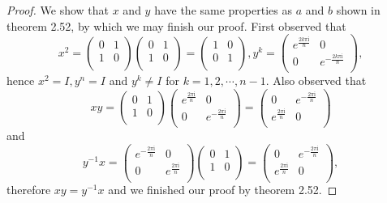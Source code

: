 \begin{proof}
We show that $x$ and $y$ have the same properties as $a$ and $b$ shown in theorem 2.52, by which we may finish our proof. First observed that 
$$
x^2=\left( \begin{matrix}
	0&		1\\
	1&		0\\
\end{matrix} \right) \left( \begin{matrix}
	0&		1\\
	1&		0\\
\end{matrix} \right) =\left( \begin{matrix}
	1&		0\\
	0&		1\\
\end{matrix} \right) ,y^k=\left( \begin{matrix}
	e^{\frac{2k\pi \mathrm{i}}{n}}&		0\\
	0&		e^{-\frac{2k\pi \mathrm{i}}{n}}\\
\end{matrix} \right) ,
$$
hence $x^2=I,y^n=I$ and $y^k\ne I$ for $k=1,2,\cdots,n-1$. Also observed that 
$$
xy=\left( \begin{matrix}
	0&		1\\
	1&		0\\
\end{matrix} \right) \left( \begin{matrix}
	e^{\frac{2\pi \mathrm{i}}{n}}&		0\\
	0&		e^{-\frac{2\pi \mathrm{i}}{n}}\\
\end{matrix} \right) =\left( \begin{matrix}
	0&		e^{-\frac{2\pi \mathrm{i}}{n}}\\
	e^{\frac{2\pi \mathrm{i}}{n}}&		0\\
\end{matrix} \right) 
$$
and
$$
y^{-1}x=\left( \begin{matrix}
	e^{-\frac{2\pi \mathrm{i}}{n}}&		0\\
	0&		e^{\frac{2\pi \mathrm{i}}{n}}\\
\end{matrix} \right) \left( \begin{matrix}
	0&		1\\
	1&		0\\
\end{matrix} \right) =\left( \begin{matrix}
	0&		e^{-\frac{2\pi \mathrm{i}}{n}}\\
	e^{\frac{2\pi \mathrm{i}}{n}}&		0\\
\end{matrix} \right) ,
$$
therefore $xy=y^{-1}x$ and we finished our proof by theorem 2.52.
\end{proof}
